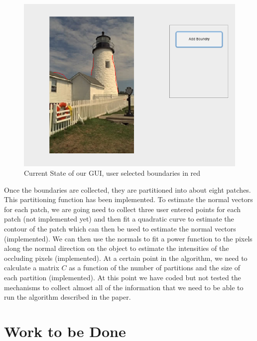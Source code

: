 \documentclass[10pt,twocolumn,letterpaper]{article}
\begin{document}
\begin{figure}[]
\centering
 \includegraphics[scale=0.35]{gui_pic.png}
\caption{Current State of our GUI, user selected boundaries in red}
\end{figure}

 Once the boundaries are collected, they are partitioned into about eight patches. This partitioning function has been implemented. To estimate the normal vectors for each patch, we are going need to collect three user entered points for each patch (not implemented yet) and then fit a quadratic curve to estimate the contour of the patch which can then be used to estimate the normal vectors (implemented). We can then use the normals to fit a power function to the pixels along the normal direction on the object to estimate the intensities of the occluding pixels (implemented). At a certain point in the algorithm, we need to calculate a matrix $C$ as a function of the number of partitions and the size of each partition (implemented). At this point we have coded but not tested the mechanisms to collect almost all of the information that we need to be able to run the algorithm described in the paper.
\section{Work to be Done}
\end{document}
